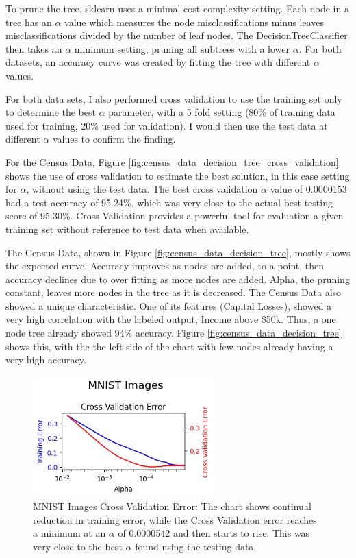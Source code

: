 \documentclass[letterpaper]{article} %
\begin{document}
To prune the tree, sklearn uses a minimal cost-complexity setting.  Each node in a tree has an $\alpha$ value which measures the node misclassifications minus leaves misclassifications divided by the number of leaf nodes.  The DecisionTreeClassifier then takes an $\alpha$ minimum setting, pruning all subtrees with a lower $\alpha$.   For both datasets, an accuracy curve was created by fitting the tree with different $\alpha$ values.  

For both data sets, I also performed cross validation to use the training set only to determine the best $\alpha$ parameter, with a 5 fold setting (80\% of training data used for training, 20\% used for validation).  I would then use the test data at different $\alpha$ values to confirm the finding.

For the Census Data, Figure \ref{fig:census_data_decision_tree_cross_validation} shows the use of cross validation to estimate the best solution, in this case setting for $\alpha$, without using the test data.   The best cross validation $\alpha$ value of 0.0000153 had a test accuracy of 95.24\%, which was very close to the actual best testing score of 95.30\%.  Cross Validation provides a powerful tool for evaluation a given training set without reference to test data when available.

The Census Data, shown in Figure \ref{fig:census_data_decision_tree},  mostly shows the expected curve.  Accuracy improves as nodes are added, to a point, then accuracy declines due to over fitting as more nodes are added.  Alpha, the pruning constant, leaves more nodes in the tree as it is decreased.  The Census Data also showed a unique characteristic.  One of its features (Capital Losses), showed a very high correlation with the labeled output, Income above \$50k.  Thus, a one node tree already showed 94\% accuracy.  Figure \ref{fig:census_data_decision_tree} shows this, with the the left side of the chart with few nodes already having a very high accuracy.  


\begin{figure}[htb]
\centering
\includegraphics[width=2.75in]{figures/MNIST_Images_decision_tree_cross_validation.png}
\caption{MNIST Images Cross Validation Error:  The chart shows continual reduction in training error, while the Cross Validation error reaches a minimum at an $\alpha$ of 0.0000542 and then starts to rise.  This was very close to the best $\alpha$ found using the testing data. }
\label{fig:MNIST_Images_decision_tree_cross_validation}
\end{figure}
\end{document}
